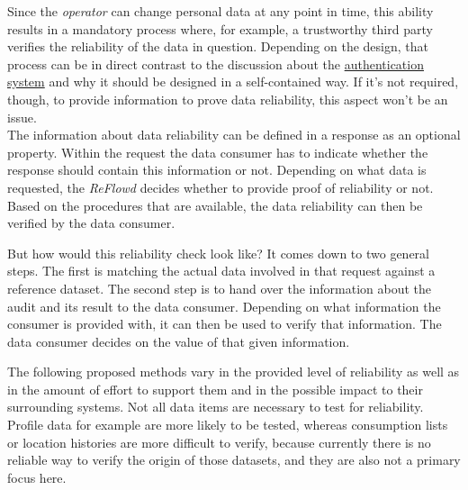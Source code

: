 \documentclass[12pt,english,a4paper,titlepage,cleardoublepage=empty,dottedtoc]{report}
\begin{document}
Since the \emph{operator} can change personal data at any point in time,
this ability results in a mandatory process where, for example, a
trustworthy third party verifies the reliability of the data in
question. Depending on the design, that process can be in direct
contrast to the discussion about the
\protect\hyperlink{authentication}{authentication system} and why it
should be designed in a self-contained way. If it's not required,
though, to provide information to prove data reliability, this aspect
won't be an issue.\\
The information about data reliability can be defined in a response as
an optional property. Within the request the data consumer has to
indicate whether the response should contain this information or not.
Depending on what data is requested, the \emph{ReFlowd} decides whether
to provide proof of reliability or not. Based on the procedures that are
available, the data reliability can then be verified by the data
consumer.

But how would this reliability check look like? It comes down to two
general steps. The first is matching the actual data involved in that
request against a reference dataset. The second step is to hand over the
information about the audit and its result to the data consumer.
Depending on what information the consumer is provided with, it can then
be used to verify that information. The data consumer decides on the
value of that given information.

The following proposed methods vary in the provided level of reliability
as well as in the amount of effort to support them and in the possible
impact to their surrounding systems. Not all data items are necessary to
test for reliability. Profile data for example are more likely to be
tested, whereas consumption lists or location histories are more
difficult to verify, because currently there is no reliable way to
verify the origin of those datasets, and they are also not a primary
focus here.
\end{document}
